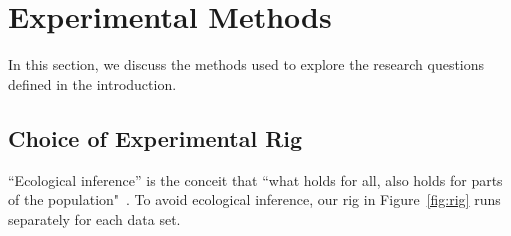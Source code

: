 \documentclass[smallcondesed]{svjour3}
\begin{document}




\section{Experimental Methods} 

In this section, we discuss the methods used to explore the research questions defined
in the introduction.








\subsection{Choice of Experimental Rig}




``Ecological inference''
is the conceit 
that ``what holds for all, also holds for parts 
of the population"~\cite{posnet11,me12d}.
To avoid ecological inference,
our  rig in Figure~\ref{fig:rig}
runs separately for each data set.  
\end{document}
